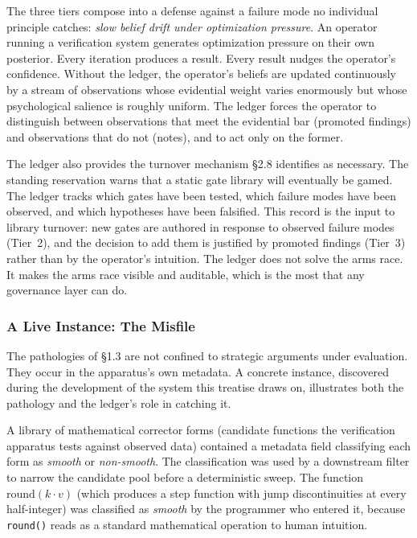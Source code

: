 \documentclass[11pt]{article}
\begin{document}
The three tiers compose into a defense against a failure mode no individual principle catches: \emph{slow belief drift under optimization pressure}. An operator running a verification system generates optimization pressure on their own posterior. Every iteration produces a result. Every result nudges the operator's confidence. Without the ledger, the operator's beliefs are updated continuously by a stream of observations whose evidential weight varies enormously but whose psychological salience is roughly uniform. The ledger forces the operator to distinguish between observations that meet the evidential bar (promoted findings) and observations that do not (notes), and to act only on the former.

The ledger also provides the turnover mechanism \S2.8 identifies as necessary. The standing reservation warns that a static gate library will eventually be gamed. The ledger tracks which gates have been tested, which failure modes have been observed, and which hypotheses have been falsified. This record is the input to library turnover: new gates are authored in response to observed failure modes (Tier~2), and the decision to add them is justified by promoted findings (Tier~3) rather than by the operator's intuition. The ledger does not solve the arms race. It makes the arms race visible and auditable, which is the most that any governance layer can do.

\subsubsection*{A Live Instance: The Misfile}

The pathologies of \S1.3 are not confined to strategic arguments under evaluation. They occur in the apparatus's own metadata. A concrete instance, discovered during the development of the system this treatise draws on, illustrates both the pathology and the ledger's role in catching it.

A library of mathematical corrector forms (candidate functions the verification apparatus tests against observed data) contained a metadata field classifying each form as \emph{smooth} or \emph{non-smooth}. The classification was used by a downstream filter to narrow the candidate pool before a deterministic sweep. The function $\text{round}(k \cdot v)$ (which produces a step function with jump discontinuities at every half-integer) was classified as \emph{smooth} by the programmer who entered it, because \texttt{round()} reads as a standard mathematical operation to human intuition.
\end{document}
